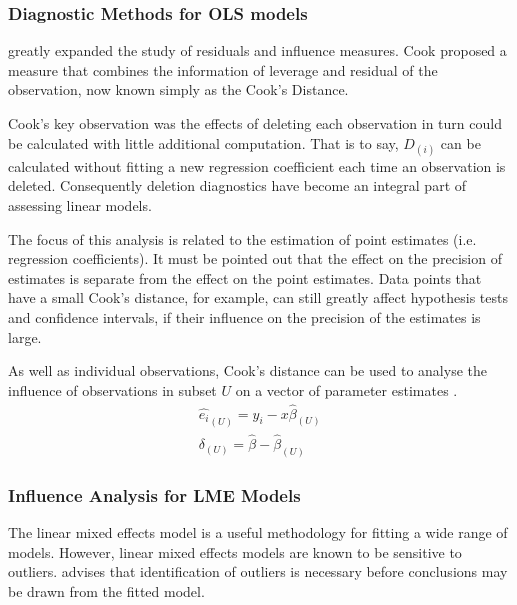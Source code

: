 \documentclass[12pt, a4paper]{report}
\theoremstyle{plain}
\theoremstyle{definition}
\theoremstyle{remark}
\begin{document}
	
	
	\subsubsection{Diagnostic Methods for OLS models}
	\citet{cook77} greatly expanded the study of residuals and influence measures.  Cook proposed a measure that combines the information of leverage and residual of the observation, now known simply as the Cook's Distance. 
	
	Cook's key observation was the effects of deleting each observation in turn could be calculated with little additional computation. That is to say, $D_{(i)}$ can be calculated without fitting a new regression coefficient each time an observation is deleted. Consequently deletion diagnostics have become an integral part of assessing linear models. 
	
	
	The focus of this analysis is related to the estimation of point estimates (i.e. regression coefficients). It must be pointed out that the effect on the precision of estimates is separate from the effect on the point estimates. Data points that
	have a small Cook's distance, for example, can still greatly affect hypothesis tests and confidence intervals, if their  influence on the precision of the estimates is large.
	
	As well as individual observations, Cook's distance can be used to analyse the influence of observations in subset $U$ on a vector of parameter estimates \citep{cook77}.
	\begin{eqnarray}
	\hat{e_{i}}_{(U)} = y_{i} - x\hat{\beta}_{(U)}\\
	\delta_{(U)} = \hat{\beta} - \hat{\beta}_{(U)}
	\end{eqnarray}
	
	\subsubsection{Influence Analysis for LME Models} %
	The linear mixed effects model is a useful methodology for fitting a wide range of models. However, linear mixed effects models are known to be sensitive to outliers. \citet{Christensen} advises that identification of outliers is necessary before conclusions may be drawn from the fitted model.
	
\end{document}
